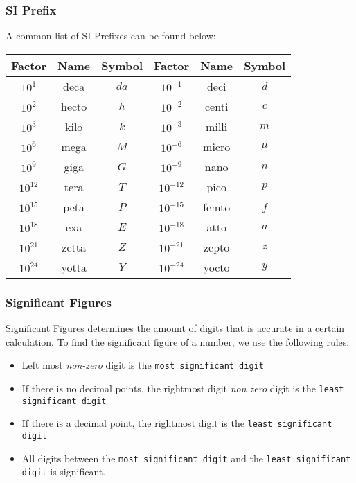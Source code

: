 \documentclass[../notes.tex]{subfiles}
\begin{document}
\subsubsection{SI Prefix}
A common list of SI Prefixes can be found below:
\begin{center}
     	 \begin{tabular}{c c c c c c}
			Factor  & Name  & Symbol & Factor     & Name  & Symbol \\
			\hline
			$10^1$  & deca  & $da$   & $10^{-1}$  & deci  & $d$ \\
			$10^2$  & hecto & $h$    & $10^{-2}$  & centi & $c$ \\
			$10^3$  & kilo  & $k$    & $10^{-3}$  & milli & $m$ \\
			$10^6$  & mega  & $M$    & $10^{-6}$  & micro & $\mu$ \\
			$10^9$  & giga  & $G$    & $10^{-9}$  & nano  & $n$ \\
			$10^12$ & tera  & $T$    & $10^{-12}$ & pico  & $p$ \\
			$10^15$ & peta  & $P$    & $10^{-15}$ & femto & $f$ \\
			$10^18$ & exa   & $E$    & $10^{-18}$ & atto  & $a$ \\
			$10^21$ & zetta & $Z$    & $10^{-21}$ & zepto & $z$ \\
			$10^24$ & yotta & $Y$    & $10^{-24}$ & yocto & $y$ \\
     	 \end{tabular}
\end{center}

\subsubsection{Significant Figures}
Significant Figures determines the amount of digits that is accurate in a certain calculation.
To find the significant figure of a number, we use the following rules:
\begin{itemize}
	\item Left most \textit{non-zero} digit is the \texttt{most significant digit}
	\item If there is no decimal points, the rightmost digit \textit{non zero} digit is the \texttt{least significant digit}
	\item If there is a decimal point, the rightmost digit is the \texttt{least significant digit}
	\item All digits between the \texttt{most significant digit} and the \texttt{least significant digit} is significant.
\end{itemize}
\end{document}
